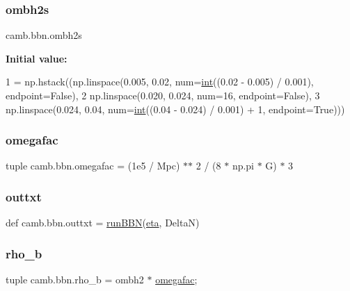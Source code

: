 \subsubsection{\texorpdfstring{ombh2s}{ombh2s}}
{\footnotesize\ttfamily camb.\+bbn.\+ombh2s}

{\bfseries Initial value\+:}
\begin{DoxyCode}
1 =  np.hstack((np.linspace(0.005, 0.02, num=\mbox{\hyperlink{namespaceCAMB__test__files_ae3f939a649209ec8d0004b0dfef3210b}{int}}((0.02 - 0.005) / 0.001), endpoint=\textcolor{keyword}{False}),
2                         np.linspace(0.020, 0.024, num=16, endpoint=\textcolor{keyword}{False}),
3                         np.linspace(0.024, 0.04, num=\mbox{\hyperlink{namespaceCAMB__test__files_ae3f939a649209ec8d0004b0dfef3210b}{int}}((0.04 - 0.024) / 0.001) + 1, endpoint=\textcolor{keyword}{True})))
\end{DoxyCode}
\mbox{\label{namespacecamb_1_1bbn_a9366441db17c0ca60e0fa48f8a8d796c}} 
\subsubsection{\texorpdfstring{omegafac}{omegafac}}
{\footnotesize\ttfamily tuple camb.\+bbn.\+omegafac = (1e5 / Mpc) $\ast$$\ast$ 2 / (8 $\ast$ np.\+pi $\ast$ G) $\ast$ 3}

\mbox{\label{namespacecamb_1_1bbn_ab579d745a27c53450178023e68108ed0}} 
\subsubsection{\texorpdfstring{outtxt}{outtxt}}
{\footnotesize\ttfamily def camb.\+bbn.\+outtxt = \mbox{\hyperlink{namespacecamb_1_1bbn_ae39e69c7217dc7635429e776f01fde55}{run\+B\+BN}}(\mbox{\hyperlink{namespacecamb_1_1bbn_acbc137606c793f20e1ded220bbfab367}{eta}}, DeltaN)}

\mbox{\label{namespacecamb_1_1bbn_ab5c5cbf9f645a4f423e0b8fdaba3c869}} 
\subsubsection{\texorpdfstring{rho\+\_\+b}{rho\_b}}
{\footnotesize\ttfamily tuple camb.\+bbn.\+rho\+\_\+b = ombh2 $\ast$ \mbox{\hyperlink{namespacecamb_1_1bbn_a9366441db17c0ca60e0fa48f8a8d796c}{omegafac}};}

